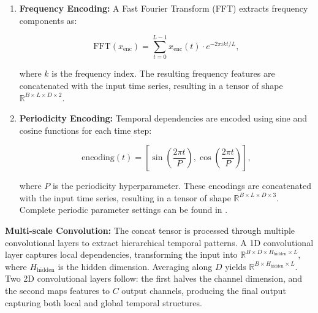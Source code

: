 \vspace{-1em}
\begin{enumerate}[leftmargin=*, itemsep=0pt]
    \item \textbf{Frequency Encoding:} A Fast Fourier Transform (FFT) extracts frequency components as:
    
    \vspace{-1em}
    \begin{equation}
    \text{FFT}(x_{\text{enc}}) = \sum_{t=0}^{L-1} x_{\text{enc}}(t) \cdot e^{-2\pi i k t / L},
    \end{equation}
    \vspace{-1em}
    
    where \( k \) is the frequency index. The resulting frequency features are concatenated with the input time series, resulting in a tensor of shape \( \mathbb{R}^{B \times L \times D \times 2} \).

    \item \textbf{Periodicity Encoding:} Temporal dependencies are encoded using sine and cosine functions for each time step:

    \vspace{-1em}
    \begin{equation}
    \text{encoding}(t) = \left[ \sin\left(\frac{2\pi t}{P}\right), \cos\left(\frac{2\pi t}{P}\right) \right],
    \end{equation}
    \vspace{-1em}
    
    where \( P \) is the periodicity hyperparameter. These encodings are concatenated with the input time series, resulting in a tensor of shape \( \mathbb{R}^{B \times L \times D \times 3} \). Complete periodic parameter settings can be found in .
\end{enumerate}
\vspace{-1em}

\noindent\textbf{Multi-scale Convolution:} The concat tensor is processed through multiple convolutional layers to extract hierarchical temporal patterns. A 1D convolutional layer captures local dependencies, transforming the input into \( \mathbb{R}^{B \times D \times H_{\text{hidden}} \times L} \), where \( H_{\text{hidden}} \) is the hidden dimension. Averaging along \( D \) yields \( \mathbb{R}^{B \times H_{\text{hidden}} \times L} \). Two 2D convolutional layers follow: the first halves the channel dimension, and the second maps features to \( C \) output channels, producing the final output capturing both local and global temporal structures.

